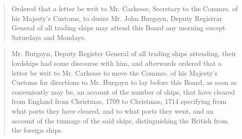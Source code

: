 \begin{quote}
    Ordered that a letter be writ to Mr. Carkesse, Secretary to the Commrs. of his Majesty's Customs, to desire Mr. John Burgoyn, Deputy Registrar General of all trading ships may attend this Board any morning except Saturdays and Mondays.
\end{quote}

\begin{quote}
    Mr. Burgoyn, Deputy Register General of all trading ships attending, their lordships had some discourse with him, and afterwards ordered that a letter be writ to Mr. Carkesse to move the Commrs. of his Majesty's Customs for directions to Mr. Burgoyn to lay before this Board, as soon as conveniently may be, an account of the number of ships, that have cleared from England from Christmas, 1709 to Christmas, 1714 specifying from what ports they have cleared, and to what ports they went, and an account of the tunnage of the said ships, distinguishing the British from the foreign ships.
\end{quote}